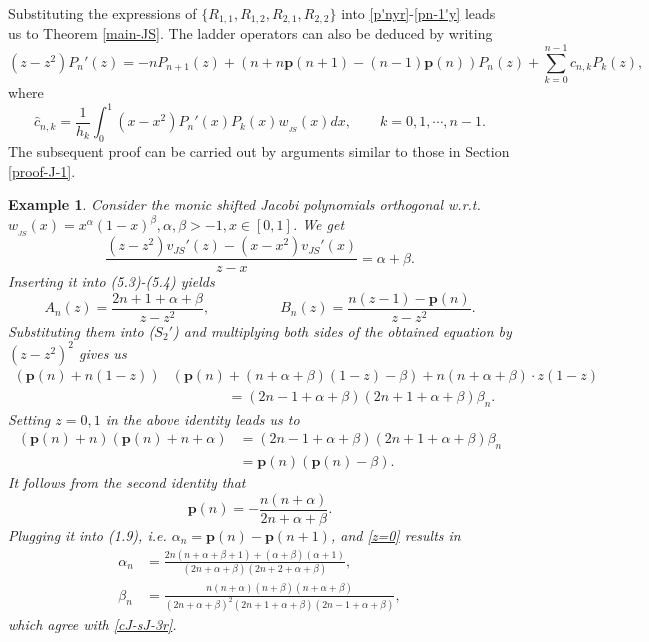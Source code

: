 \documentclass[12pt,a4paper]{article}    %
\newtheorem{exm}{Example}
\numberwithin{equation}{section}
\begin{document}
Substituting the expressions of $\{R_{1,1},R_{1,2},R_{2,1},R_{2,2}\}$ into \eqref{p'nyr}-\eqref{pn-1'y} leads us to Theorem \ref{main-JS}. The ladder operators can also be deduced by writing
\begin{equation}\label{lo-JS-1}		 (z-z^2)P_n'(z)=-nP_{n+1}(z)+\left(n+n\textbf{p}(n+1)-(n-1)\textbf{p}(n)\right)P_n(z)+\sum_{k=0}^{n-1}\widehat{c}_{n,k}P_k(z),
	\end{equation}
where
\begin{equation*}	 \widehat{c}_{n,k}=\frac{1}{h_k}\int_{0}^{1}(x-x^2)P_n'(x)P_k(x)w_{_{JS}}(x)dx,\qquad k=0,1,\cdots,n-1.
\end{equation*}
The subsequent proof can be carried out by arguments similar to those in Section \ref{proof-J-1}.

\begin{exm}
Consider the monic shifted Jacobi polynomials orthogonal w.r.t. $w_{_{JS}}(x)=x^\alpha(1-x)^\beta,\alpha,\beta>-1,x \in [0,1]$. We get
	\begin{equation}		 \frac{(z-z^2)v_{JS}'(z)-(x-x^2)v_{JS}'(x)}{z-x}=\alpha+\beta.\nonumber
	\end{equation}
Inserting it into (5.3)-(5.4) yields
	\begin{equation}		 A_n(z)=\frac{2n+1+\alpha+\beta}{z-z^2},\qquad\qquad\quad B_n(z)=\frac{n(z-1)-\mathbf{p}(n)}{z-z^2}.\nonumber
	\end{equation}
Substituting them into ($S_2'$) and multiplying both sides of the obtained equation by $(z-z^2)^2$ gives us
	\begin{align}		 \left(\mathbf{p}(n)+n(1-z)\right)&\left(\mathbf{p}(n)+(n+\alpha+\beta)(1-z)-\beta\right)+n(n+\alpha+\beta)\cdot z(1-z)\nonumber\\		 &\qquad\qquad=(2n-1+\alpha+\beta)(2n+1+\alpha+\beta)\beta_n .\nonumber
	\end{align}
	Setting $z=0,1$ in the above identity leads us to
	\begin{align}
		\label{z=0}		 \left(\mathbf{p}(n)+n\right)\left(\mathbf{p}(n)+n+\alpha\right)&=(2n-1+\alpha+\beta)(2n+1+\alpha+\beta)\beta_n\\		 \label{z=1}		 &=\mathbf{p}(n)\left(\mathbf{p}(n)-\beta\right).\nonumber
	\end{align}
	It follows from the second identity that
	\begin{equation}
		 \mathbf{p}(n)=-\frac{n(n+\alpha)}{2n+\alpha+\beta}\nonumber.
	\end{equation}
Plugging it into (1.9), i.e. $\alpha_n=\mathbf{p}(n)-\mathbf{p}(n+1)$, and \eqref{z=0} results in
	\begin{align*}		 \alpha_n&=\frac{2n(n+\alpha+\beta+1)+(\alpha+\beta)(\alpha+1)}{(2n+\alpha+\beta)(2n+2+\alpha+\beta)},\\		 \beta_n&=\frac{n(n+\alpha)(n+\beta)(n+\alpha+\beta)}{(2n+\alpha+\beta)^2(2n+1+\alpha+\beta)(2n-1+\alpha+\beta)},
\end{align*}
which agree with \eqref{cJ-sJ-3r}.
\end{exm}
\end{document}

